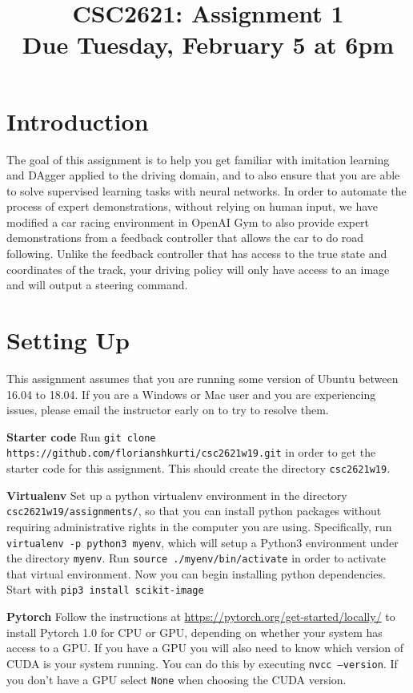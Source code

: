 \documentclass[a4paper,10pt]{article}
\title{CSC2621: Assignment 1\\Due Tuesday, February 5  at 6pm}
\author{}
\def\code#1{\texttt{#1}}
\begin{document}
\maketitle


\section{Introduction}
The goal of this assignment is to help you get familiar with imitation learning and DAgger applied to the driving domain, and to also ensure that you are able to solve supervised learning
tasks with neural networks. In order to automate the process of expert demonstrations, without relying on human input, we have modified a car racing environment in OpenAI Gym to also provide 
expert demonstrations from a feedback controller that allows the car to do road following. Unlike the feedback controller that has access to the true state and coordinates of the track, your 
driving policy will only have access to an image and will output a steering command. 


\section{Setting Up}
This assignment assumes that you are running some version of Ubuntu between 16.04 to 18.04. If you are a Windows or Mac user and you are experiencing issues, please
email the instructor early on to try to resolve them.
\newline

\noindent \textbf{Starter code} Run \code{git clone https://github.com/florianshkurti/csc2621w19.git} in order to get the starter code for this assignment. This should create the directory
\code{csc2621w19}.
\newline

\noindent \textbf{Virtualenv} Set up a python virtualenv environment in the directory \code{csc2621w19/assignments/}, so that you can install python packages without requiring administrative
rights in the computer you are using. Specifically, run \code{virtualenv -p python3 myenv}, which will setup a Python3 environment under the directory \code{myenv}. Run \code{source ./myenv/bin/activate}
in order to activate that virtual environment. Now you can begin installing python dependencies. Start with \code{pip3 install scikit-image}
\newline

\noindent \textbf{Pytorch} Follow the instructions at \url{https://pytorch.org/get-started/locally/} to install Pytorch 1.0 for CPU or GPU, depending on whether your system has access to a GPU.
If you have a GPU you will also need to know which version of CUDA is your system running. You can do this by executing \code{nvcc --version}. If you don't have a GPU select \code{None} when choosing
the CUDA version.
\newline
\end{document}
